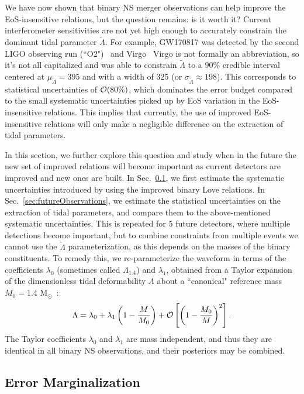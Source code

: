 \documentclass[prd,twocolumn,nofootinbib,superscriptaddress,amsmath,amssymb]{revtex4-1}
\begin{document}
We have now shown that binary NS merger observations can help improve the EoS-insensitive relations, but the question remains: is it worth it?
Current interferometer sensitivities are not yet high enough to accurately constrain the dominant tidal parameter $\tilde{\Lambda}$.
For example, GW170817 was detected by the second LIGO observing run (``O2")~\cite{aLIGO} and Virgo~\cite{TheVirgo:2014hva} Virgo is not formally an abbreviation,  so it's not all capitalized and was able to constrain $\tilde{\Lambda}$ to a $90\%$ credible interval centered at $\mu_{\tilde{\Lambda}}=395$ and with a width of 325 (or $\sigma_{\tilde{\Lambda}} \approx 198$).  This corresponds to statistical uncertainties of ${\cal{O}}(80\%)$, which dominates the error budget compared to the small systematic uncertainties picked up by EoS variation in the EoS-insensitive relations.
This implies that currently, the use of improved EoS-insensitive relations will only make a negligible difference on the extraction of tidal parameters.

In this section, we further explore this question and study when in the future the new set of improved relations will become important as current detectors are improved and new ones are built. In Sec.~\ref{sec:marginalization}, we first estimate the systematic uncertainties introduced by using the improved binary Love relations.
In Sec.~\ref{sec:futureObservations}, we estimate the statistical uncertainties on the extraction of tidal parameters, and compare them to the above-mentioned systematic uncertainties.
This is repeated for 5 future detectors, where multiple detections become important, but to combine constraints from multiple events we cannot use the $\tilde\Lambda$ parameterization, as this depends on the masses of the binary constituents. To remedy this, we re-parameterize the waveform in terms of the coefficients $\lambda_0$ (sometimes called $\Lambda_{1.4}$) and $\lambda_1$, obtained from a Taylor expansion of the dimensionless tidal deformability $\Lambda$ about a ``canonical" reference mass $M_0=1.4\text{ M}_{\odot}$~\cite{delPozzo:TaylorTidal,Yagi:binLove}:
\begin{equation}
\Lambda = \lambda_0 + \lambda_1 \left(1-\frac{M}{M_0}\right) + {\cal{O}}\left[\left(1-\frac{M_{0}}{M}\right)^{2}\right].
\end{equation}
The Taylor coefficients $\lambda_0$ and $\lambda_1$ are mass independent, and thus they are identical in all binary NS observations, and their posteriors may be combined.

\subsection{Error Marginalization}\label{sec:marginalization}
\end{document}
